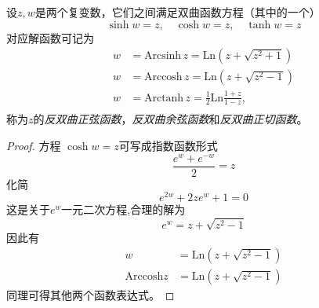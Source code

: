 \begin{definition}
  设$z,w$是两个复变数，它们之间满足双曲函数方程（其中的一个）
  \[ \sinh w =z, \quad \cosh w =z, \quad \tanh w =z\]
  对应解函数可记为 
  \begin{equation}
   \begin{aligned}
    w &= \text{Arcsinh}\,z = \text{Ln}(z + \sqrt{z^2 +1})\\
    w &= \text{Arccosh}\,z = \text{Ln}(z + \sqrt{z^2 -1})\\
    w &= \text{Arctanh}\,z = \frac{1}{2}\text{Ln} \frac{1+z}{1-z},\\
   \end{aligned}
  \end{equation}
  称为$z$的\emph{反双曲正弦函数}，\emph{反双曲余弦函数}和\emph{反双曲正切函数}。 
\end{definition}
\begin{proof}
  方程 $\cosh w =z $可写成指数函数形式
  \[ \frac{e^{w} + e^{-w} }{2} =z \]
  化简 
  \[ e^{2 w} + 2z e^w + 1 =0\]
  这是关于$ e^w$一元二次方程,合理的解为
  \[ e ^{w} = z + \sqrt{z^2 -1}\]
  因此有 
  \[\begin{aligned}
    w & = \text{Ln}(z + \sqrt{z^2 -1}) \\
    \text{Arccosh}z & = \text{Ln}(z + \sqrt{z^2 -1})
  \end{aligned}\]
  同理可得其他两个函数表达式。
\end{proof}

